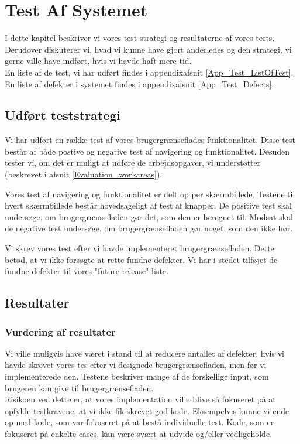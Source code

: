\chapter{Test Af Systemet}
\label{Test}
I dette kapitel beskriver vi vores test strategi og resultaterne af vores tests. Derudover diskuterer vi, hvad vi kunne have gjort anderledes og den strategi, vi gerne ville have indført, hvis vi havde haft mere tid.
\\En liste af de test, vi har udført findes i appendixafsnit \ref{App_Test_ListOfTest}. En liste af defekter i systemet findes i appendixafsnit \ref{App_Test_Defects}.

\section{Udført teststrategi}
\label{Test_strat}
Vi har udført en række test af vores brugergrænseflades funktionalitet. Disse test består af både postive og negative test af navigering og funktionalitet. Desuden tester vi, om det er muligt at udføre de arbejdsopgaver, vi understøtter (beskrevet i afsnit \ref{Evaluation_workareas}).

Vores test af navigering og funktionalitet er delt op per skærmbillede. Testene til hvert skærmbillede består hovedsageligt af test af knapper. De positive test skal undersøge, om brugergrænsefladen gør det, som den er beregnet til. Modsat skal de negative test undersøge, om brugergrænsefladen gør noget, som den ikke bør.

Vi skrev vores test efter vi havde implementeret brugergrænsefladen. Dette betød, at vi ikke forsøgte at rette fundne defekter. Vi har i stedet  tilføjet de fundne defekter til vores "future release"-liste.

\section{Resultater}
\label{Test_Results}


\subsection{Vurdering af resultater}
\label{Test_Results_eval}


Vi ville muligvis have været i stand til at reducere antallet af defekter, hvis vi havde skrevet vores tes efter vi designede brugergrænsefladen, men før vi implementerede den. Testene beskriver mange af de forskellige input, som brugeren kan give til brugergrænsefladen. 
\\Risikoen ved dette er, at vores implementation ville blive så fokuseret på at opfylde testkravene, at vi ikke fik skrevet god kode. Eksempelvis kunne vi ende op med kode, som var fokuseret på at bestå individuelle test. Kode, som er fokuseret på enkelte cases, kan være svært at udvide og/eller vedligeholde.

